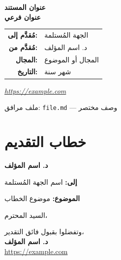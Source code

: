\documentclass[11pt,a4paper]{article}
\begin{document}
\begin{titlepage}
\centering
\vspace*{2cm}
{\Huge\bfseries عنوان المستند\\[0.3em]
عنوان فرعي\par}
\vspace{1.5cm}
{\large
\begin{tabular}{rl}
\textbf{مُقدَّم إلى:} & الجهة المُستلمة\\
\textbf{مُقدَّم من:} & د. اسم المؤلف\\
\textbf{المجال:} & المجال أو الموضوع\\
\textbf{التاريخ:} & شهر سنة\\
\end{tabular}\par}
\vspace{1.5cm}
{\large\itshape \url{https://example.com}\par}
\vfill
{\small ملف مرافق: \texttt{file.md} — وصف مختصر}
\end{titlepage}

\newpage
\setcounter{page}{2}

\section*{خطاب التقديم}

\begin{flushright}
\textbf{د. اسم المؤلف}
\end{flushright}

\vspace{0.5em}
\textbf{إلى:} اسم الجهة المُستلمة

\vspace{0.5em}
\textbf{الموضوع:} موضوع الخطاب

\vspace{0.8em}
السيد المحترم،


\vspace{1em}
وتفضلوا بقبول فائق التقدير،\\[0.5em]
\textbf{د. اسم المؤلف}\\
\url{https://example.com}
\end{document}
